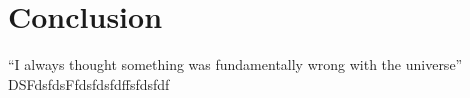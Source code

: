 \documentclass{article}
\begin{document}
\section{Conclusion}
``I always thought something was fundamentally wrong with the universe'' \citep{adams1995hitchhiker}\\
DSFdsfdsFfdsfdsfdffsfdsfdf


% 
\end{document}

